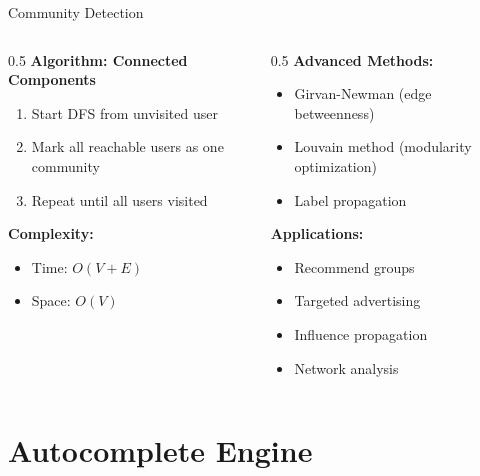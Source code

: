 \documentclass[aspectratio=169,xcolor=dvipsnames]{beamer}
\begin{document}
\begin{frame}{Community Detection}
  \begin{columns}
    \begin{column}{0.5\textwidth}
      \textbf{Algorithm: Connected Components}
      \begin{enumerate}
        \item Start DFS from unvisited user
        \item Mark all reachable users as one community
        \item Repeat until all users visited
      \end{enumerate}

      \vspace{0.3cm}
      \textbf{Complexity:}
      \begin{itemize}
        \item Time: $O(V + E)$
        \item Space: $O(V)$
      \end{itemize}
    \end{column}

    \begin{column}{0.5\textwidth}
      \textbf{Advanced Methods:}
      \begin{itemize}
        \item Girvan-Newman (edge betweenness)
        \item Louvain method (modularity optimization)
        \item Label propagation
      \end{itemize}

      \vspace{0.3cm}
      \textbf{Applications:}
      \begin{itemize}
        \item Recommend groups
        \item Targeted advertising
        \item Influence propagation
        \item Network analysis
      \end{itemize}
    \end{column}
  \end{columns}
\end{frame}

\section{Autocomplete Engine}
\end{document}
